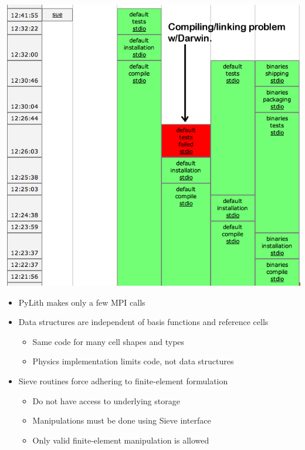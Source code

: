 \documentclass[pdftex,cig,slideColor]{pp4slides}
\begin{document}

 \begin{center}
   \includegraphics[scale=0.68]{figs/buildbotsuccess}
 \end{center}
  
 
 \begin{itemize}
 \item PyLith makes only a few MPI calls
 \item Data structures are independent of basis functions and
   reference cells
   \begin{itemize}
   \item Same code for many cell shapes and types
   \item Physics implementation limits code, not data structures
   \end{itemize}
 \item Sieve routines force adhering to finite-element formulation
   \begin{itemize}
   \item Do not have access to underlying storage
   \item Manipulations must be done using Sieve interface
   \item Only valid finite-element manipulation is allowed
   \end{itemize}
 \end{itemize}
  
\end{document}

